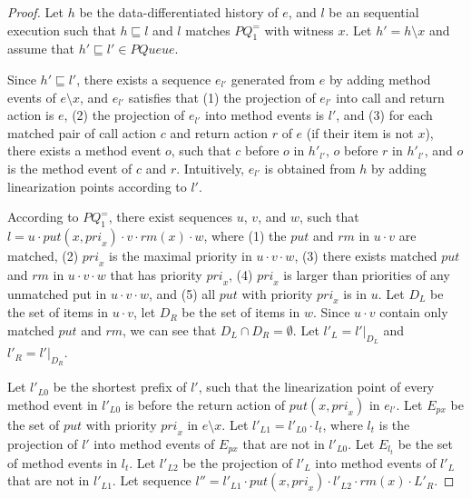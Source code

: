 \begin {proof}

Let $h$ be the data-differentiated history of $e$, and $l$ be an sequential execution such that $h \sqsubseteq l$ and $l$ matches $\textit{PQ}_1^{=}$ with witness $x$. Let $h'=h \setminus x$ and assume that $h' \sqsubseteq l' \in \textit{PQueue}$.

Since $h' \sqsubseteq l'$, there exists a sequence $e_{l'}$ generated from $e$ by adding method events of $e \setminus x$, and $e_{l'}$ satisfies that (1) the projection of $e_{l'}$ into call and return action is $e$, (2) the projection of $e_{l'}$ into method events is $l'$, and (3) for each matched pair of call action $c$ and return action $r$ of $e$ (if their item is not $x$), there exists a method event $o$, such that $c$ before $o$ in $h'_{l'}$, $o$ before $r$ in $h'_{l'}$, and $o$ is the method event of $c$ and $r$. Intuitively, $e_{l'}$ is obtained from $h$ by adding linearization points according to $l'$.

According to $\textit{PQ}_1^{=}$, there exist sequences $u$, $v$, and $w$, such that $l=u \cdot \textit{put}(x,\textit{pri}_x) \cdot v \cdot \textit{rm}(x) \cdot w$, where (1) the $\textit{put}$ and $\textit{rm}$ in $u \cdot v$ are matched, (2) $\textit{pri}_x$ is the maximal priority in $u \cdot v \cdot w$, (3) there exists matched $\textit{put}$ and $\textit{rm}$ in $u \cdot v \cdot w$ that has priority $\textit{pri}_x$, (4) $\textit{pri}_x$ is larger than priorities of any unmatched put in $u \cdot v \cdot w$, and (5) all $\textit{put}$ with priority $\textit{pri}_x$ is in $u$. Let $D_L$ be the set of items in $u \cdot v$, let $D_R$ be the set of items in $w$. Since $u \cdot v$ contain only matched $\textit{put}$ and $\textit{rm}$, we can see that $D_L \cap D_R = \emptyset$. Let $l'_L = l' \vert_{D_L}$ and $l'_R = l' \vert_{D_R}$.

Let $l'_{\textit{L0}}$ be the shortest prefix of $l'$, such that the linearization point of every method event in  $l'_{\textit{L0}}$ is before the return action of $\textit{put}(x,\textit{pri}_x)$ in $e_{l'}$. Let $E_{px}$ be the set of $\textit{put}$ with priority $\textit{pri}_x$ in $e \setminus x$. Let $l'_{\textit{L1}} = l'_{\textit{L0}} \cdot l_t$, where $l_t$ is the projection of $l'$ into method events of $E_{px}$ that are not in $l'_{\textit{L0}}$. Let $E_{l_t}$ be the set of method events in $l_t$. Let $l'_{\textit{L2}}$ be the projection of $l'_L$ into method events of $l'_L$ that are not in $l'_{\textit{L1}}$. Let sequence $l'' = l'_{L1} \cdot \textit{put}(x,\textit{pri}_x) \cdot l'_{L2} \cdot \textit{rm}(x) \cdot L'_R$.


\end{proof}
